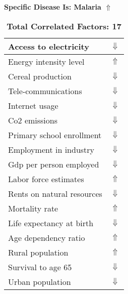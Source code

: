 \documentclass[12pt,notitlepage,oneside]{report}
\begin{document}
\begin{table}[!htb]
\caption{\textbf{Specific Disease Is: Malaria $\Uparrow$}}
\centering
\label{Correlated Socio-economic Factors0}
\begin{tabular}{|l|l|}
\hline
Access to electricity & $\Downarrow$\\ \hline
Energy intensity level & $\Uparrow$\\ \hline
Cereal production & $\Downarrow$\\ \hline
Tele-communications & $\Downarrow$\\ \hline
Internet usage & $\Downarrow$\\ \hline
Co2 emissions & $\Downarrow$\\ \hline
Primary school enrollment & $\Downarrow$\\ \hline
Employment in industry & $\Downarrow$\\ \hline
Gdp per person employed & $\Downarrow$\\ \hline
Labor force estimates & $\Uparrow$\\ \hline
Rents on natural resources & $\Downarrow$\\ \hline
Mortality rate & $\Uparrow$\\ \hline
Life expectancy at birth & $\Downarrow$\\ \hline
Age dependency ratio & $\Uparrow$\\ \hline
Rural population & $\Uparrow$\\ \hline
Survival to age 65 & $\Downarrow$\\ \hline
Urban population & $\Downarrow$\\ \hline
\end{tabular}
\caption*{\textbf{Total Correlated Factors: 17}}
\end{table}
\end{document}
